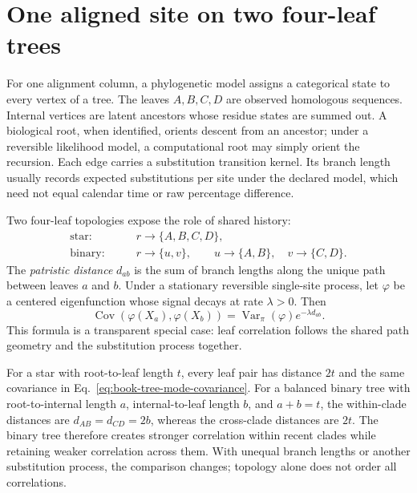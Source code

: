 \section{One aligned site on two four-leaf trees}
\label{sec:book-phylogeny-toy-tree}

For one alignment column, a phylogenetic model assigns a categorical state to every vertex of a
tree.  The leaves $A,B,C,D$ are observed homologous sequences.  Internal vertices are latent
ancestors whose residue states are summed out.  A biological root, when identified, orients descent
from an ancestor; under a reversible likelihood model, a computational root may simply orient the
recursion.  Each edge carries a substitution transition kernel.  Its branch length usually records
expected substitutions per site under the declared model, which need not equal calendar time or
raw percentage difference.

Two four-leaf topologies expose the role of shared history:
\begin{equation}
\begin{aligned}
\text{star:}&\qquad r\longrightarrow\{A,B,C,D\},\\
\text{binary:}&\qquad
r\longrightarrow\{u,v\},\qquad
u\longrightarrow\{A,B\},\quad v\longrightarrow\{C,D\}.
\end{aligned}
\label{eq:book-star-binary-trees}
\end{equation}
The \emph{patristic distance} $d_{ab}$ is the sum of branch lengths along the unique path between
leaves $a$ and $b$.  Under a stationary reversible single-site process, let $\varphi$ be a centered
eigenfunction whose signal decays at rate $\lambda>0$.  Then
\begin{equation}
\operatorname{Cov}\!\left(\varphi(X_a),\varphi(X_b)\right)
=\operatorname{Var}_{\pi}(\varphi)e^{-\lambda d_{ab}}.
\label{eq:book-tree-mode-covariance}
\end{equation}
This formula is a transparent special case: leaf correlation follows the shared path geometry and
the substitution process together.

For a star with root-to-leaf length $t$, every leaf pair has distance $2t$ and the same covariance
in Eq.~\ref{eq:book-tree-mode-covariance}.  For a balanced binary tree with root-to-internal length
$a$, internal-to-leaf length $b$, and $a+b=t$, the within-clade distances are
$d_{AB}=d_{CD}=2b$, whereas the cross-clade distances are $2t$.  The binary tree therefore creates
stronger correlation within recent clades while retaining weaker correlation across them.  With
unequal branch lengths or another substitution process, the comparison changes; topology alone
does not order all correlations.

